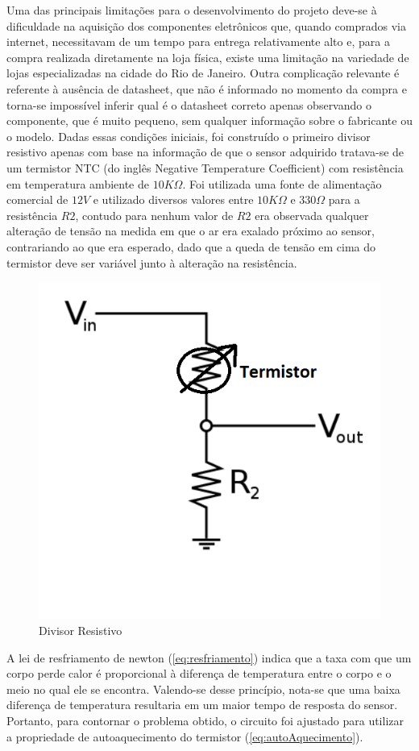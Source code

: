  
Uma das principais limitações para o desenvolvimento do projeto deve-se à dificuldade na aquisição dos componentes eletrônicos que, quando comprados via internet, necessitavam de um tempo para entrega relativamente alto e, para a compra realizada diretamente na loja física, existe uma limitação na variedade de lojas especializadas na cidade do Rio de Janeiro. Outra complicação relevante é referente à ausência de datasheet, que não é informado no momento da compra e torna-se impossível inferir qual é o datasheet correto apenas observando o componente, que é muito pequeno, sem qualquer informação sobre o fabricante ou o modelo. Dadas essas condições iniciais, foi construído o primeiro divisor resistivo apenas com base na informação de que o sensor adquirido tratava-se de um termistor NTC (do inglês Negative Temperature Coefficient) com resistência em temperatura ambiente de $10K\Omega$. Foi utilizada uma fonte de alimentação comercial de $12V$ e utilizado diversos valores entre $10K\Omega$ e $330\Omega$ para a resistência $R2$, contudo para nenhum valor de $R2$ era observada qualquer alteração de tensão na medida em que o ar era exalado próximo ao sensor, contrariando ao que era esperado, dado que a queda de tensão em cima do termistor deve ser variável junto à alteração na resistência.
 
\begin{figure}[h!]
	\begin{center}
 		\includegraphics[width=0.5\linewidth]{images/divisor_resistivo.png}
 		\caption{Divisor Resistivo}
 		\label{fig:divisorResistivo}
 	\end{center}
\end{figure}
 
A lei de resfriamento de newton (\ref{eq:resfriamento}) indica que a taxa com que um corpo perde calor é proporcional à diferença de temperatura entre o corpo e o meio  no qual ele se encontra. Valendo-se desse princípio, nota-se que uma baixa diferença de temperatura resultaria em um maior tempo de resposta do sensor. Portanto, para contornar o problema obtido, o circuito foi ajustado para utilizar a propriedade de autoaquecimento do termistor (\ref{eq:autoAquecimento}). 
 
